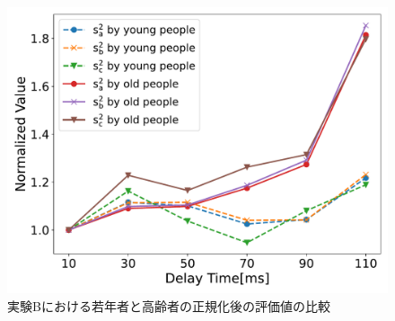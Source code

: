 \begin{figure}[tbp]
  \centering
  \includegraphics[scale=0.5]{figures/Honbann/Comparison_young_old/40_var_normalized.pdf}
  \caption{実験Bにおける若年者と高齢者の正規化後の評価値の比較}
  \label{fig:Normalized-Var_40ms_SaSbSc}
\end{figure}

